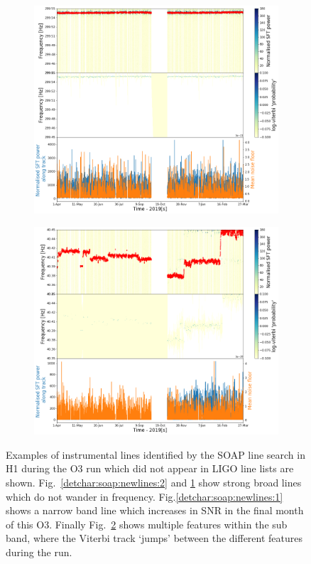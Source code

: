 \begin{figure}[ht]
	\begin{subfigure}[h]{0.49\textwidth}
		\includegraphics[width=\textwidth]{C6_detchar/track_F299_45_299_55.png}
		\caption{\label{detchar:soap:newlines:3}}
	\end{subfigure}
	\begin{subfigure}[h]{0.49\textwidth}
		\includegraphics[width=\textwidth]{C6_detchar/track_F40_35_40_45.png}
		\caption{\label{detchar:soap:newlines:4}}
	\end{subfigure}
	\caption[New lines identified by SOAP.]{ Examples of instrumental lines identified by the SOAP line search in H1 during the O3 run which did not appear in \gls{LIGO} line lists are shown. Fig.~\ref{detchar:soap:newlines:2} and \ref{detchar:soap:newlines:3} show strong broad lines which do not wander in frequency. Fig.\ref{detchar:soap:newlines:1} shows a narrow band line which increases in \gls{SNR} in the final month of this O3. Finally Fig.~\ref{detchar:soap:newlines:4} shows multiple features within the sub band, where the Viterbi track `jumps' between the different features during the run.}
	\label{detchar:soap:newlines}
\end{figure}
%
\clearpage 

